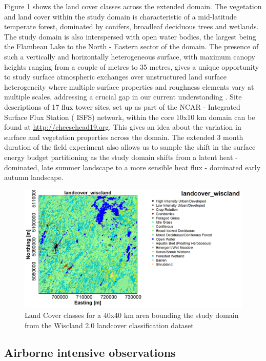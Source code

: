 \documentclass[draft]{agujournal2019}
\begin{document}
Figure \ref{fig:land_cover} shows the land cover classes across the extended domain. The vegetation and land cover within the study domain is characteristic of a mid-latitude temperate forest, dominated by conifers, broadleaf deciduous trees and wetlands. The study domain is also interspersed with open water bodies, the largest being the Flambeau Lake to the North - Eastern sector of the domain. The presence of such a vertically and horizontally heterogeneous surface, with maximum canopy heights ranging from a couple of metres to 35 metres, gives a unique opportunity to study surface atmospheric exchanges over unstructured land surface heterogeneity where multiple surface properties and roughness elements vary at multiple scales, addressing a crucial gap in our current understanding \cite{bou-zeid_persistent_2020}. Site descriptions of 17 flux tower sites, set up as part of the NCAR - Integrated Surface Flux Station ( ISFS) network, within the core 10x10 km domain can be found at \url{http://cheesehead19.org}. This gives an idea about the variation in surface and vegetation properties across the domain. The extended 3 month duration of the field experiment also allows us to sample the shift in the surface energy budget partitioning as the study domain shifts from a latent heat - dominated, late summer landscape to a more sensible heat flux - dominated early autumn landscape.
 \begin{figure}[hbtp]
 \noindent\includegraphics[width=\textwidth]{land_cover.png}
\caption{Land Cover classes for  a 40x40 km area bounding the study domain from the Wiscland 2.0 landcover classification dataset}
\label{fig:land_cover}
 \end{figure}

\subsection{Airborne intensive observations}
\end{document}
